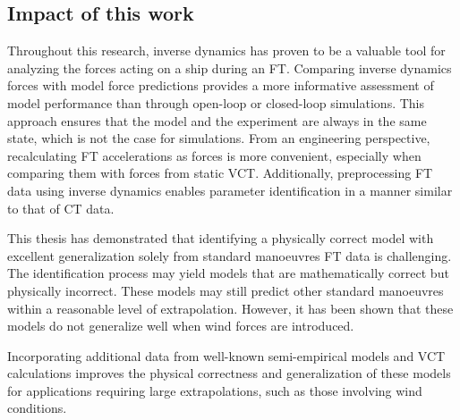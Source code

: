 \subsection*{Impact of this work}
Throughout this research, inverse dynamics has proven to be a valuable tool for analyzing the forces acting on a ship during an FT. Comparing inverse dynamics forces with model force predictions provides a more informative assessment of model performance than through open-loop or closed-loop simulations. This approach ensures that the model and the experiment are always in the same state, which is not the case for simulations. From an engineering perspective, recalculating FT accelerations as forces is more convenient, especially when comparing them with forces from static VCT. Additionally, preprocessing FT data using inverse dynamics enables parameter identification in a manner similar to that of CT data.

This thesis has demonstrated that identifying a physically correct model with excellent generalization solely from standard manoeuvres FT data is challenging. The identification process may yield models that are mathematically correct but physically incorrect. These models may still predict other standard manoeuvres within a reasonable level of extrapolation. However, it has been shown that these models do not generalize well when wind forces are introduced.

Incorporating additional data from well-known semi-empirical models and VCT calculations improves the physical correctness and generalization of these models for applications requiring large extrapolations, such as those involving wind conditions. 